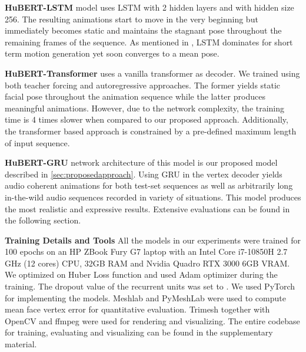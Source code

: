 \documentclass[10pt,twocolumn,letterpaper]{article}
\begin{document}
\noindent\textbf{HuBERT-LSTM} model uses LSTM with 2 hidden layers and with hidden size 256. The resulting animations start to move in the very beginning but immediately becomes static and maintains the stagnant pose throughout the remaining frames of the sequence. As mentioned in \cite{fragkiadaki}, LSTM dominates for short term motion generation yet soon converges to a mean pose. 



\noindent\textbf{HuBERT-Transformer} uses a vanilla transformer as decoder. We trained using both teacher forcing and autoregressive approaches. The former yields static facial pose throughout the animation sequence while the latter produces meaningful animations. However, due to the network complexity, the training time is 4 times slower when compared to our proposed approach. Additionally, the transformer based approach is constrained by a pre-defined maximum length of input sequence.


\noindent\textbf{HuBERT-GRU} network architecture of this model is our proposed model described in \cref{sec:proposedapproach}. Using GRU in the vertex decoder yields audio coherent animations for both test-set sequences as well as arbitrarily long in-the-wild audio sequences recorded in variety of situations. This model produces the most realistic and expressive results. Extensive evaluations can be found in the following section.

\noindent\textbf{Training Details and Tools} All the models in our experiments were trained for 100 epochs on an HP ZBook Fury G7 laptop with an Intel Core i7-10850H 2.7 GHz (12 cores) CPU, 32GB RAM and Nvidia Quadro RTX 3000 6GB VRAM. We optimized on Huber Loss function \cite{huberloss} and used Adam optimizer \cite{adam} during the training. The dropout value of the recurrent units was set to . We used PyTorch \cite{PyTorch} for implementing the models. Meshlab \cite{MeshLab} and PyMeshLab \cite{pymeshlab} were used to compute mean face vertex error for quantitative evaluation. Trimesh \cite{TrimeshLib} together with OpenCV \cite{opencv_library} and ffmpeg \cite{ffmpeg} were used for rendering and visualizing. The entire codebase for training, evaluating and visualizing can be found in the supplementary material. 
\end{document}
